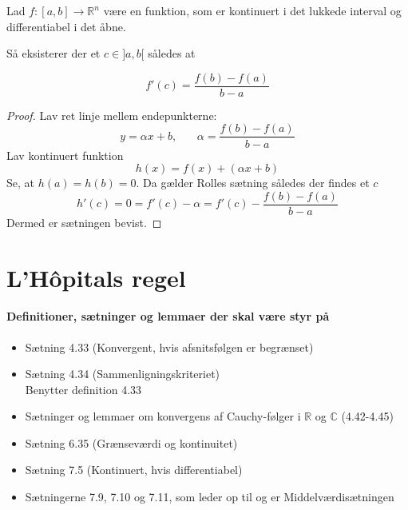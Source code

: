 \begin{theorem}[Middelværdisætningen]
Lad $f:[a,b]\to\mathbb{R}^n$ være en funktion, som er kontinuert i det lukkede interval og differentiabel i det åbne.\\
\centerline{Så eksisterer der et $c\in]a,b[$ således at}
\begin{equation}
f'(c)=\frac{f(b)-f(a)}{b-a}
\end{equation}
\end{theorem}
\begin{proof}
Lav ret linje mellem endepunkterne:
\begin{equation}
y=\alpha x+b,\phantom{mm}\alpha=\frac{f(b)-f(a)}{b-a}
\end{equation}
Lav kontinuert funktion
\begin{equation}
h(x)=f(x)+(\alpha x+b)
\end{equation}
Se, at $h(a)=h(b)=0$. Da gælder Rolles sætning således der findes et $c$
\begin{equation}
h'(c)=0=f'(c)-\alpha=f'(c)-\frac{f(b)-f(a)}{b-a}
\end{equation}
Dermed er sætningen bevist.
\end{proof}
\clearpage
\chapter{L'Hôpitals regel}
\subsubsection{Definitioner, sætninger og lemmaer der skal være styr på}
\begin{itemize}
\setlength\itemsep{0em}
\item Sætning 4.33 (Konvergent, hvis afsnitsfølgen er begrænset)
\item Sætning 4.34 (Sammenligningskriteriet)\\
Benytter definition 4.33
\item Sætninger og lemmaer om konvergens af Cauchy-følger i $\mathbb{R}$ og $\mathbb{C}$ (4.42-4.45)
\item Sætning 6.35 (Grænseværdi og kontinuitet)
\item Sætning 7.5 (Kontinuert, hvis differentiabel)
\item Sætningerne 7.9, 7.10 og 7.11, som leder op til og er Middelværdisætningen
\end{itemize}
